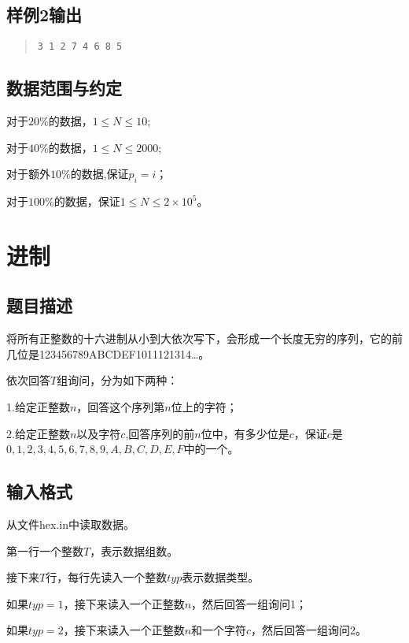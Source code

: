 ﻿\documentclass[12pt, a4paper]{article}
\begin{document}
\subsection{样例2输出}
\begin{quote}
\begin{verbatim}
3 1 2 7 4 6 8 5
\end{verbatim}
\end{quote}

\subsection{数据范围与约定}

对于$20\%$的数据，$1 \leq N \leq 10$;

对于$40\%$的数据，$1 \leq N \leq 2000$;

对于额外$10\%$的数据,保证$p_i=i$；

对于$100\%$的数据，保证$1 \leq N \leq 2\times 10^5$。

\newpage
\section{进制}

\subsection{题目描述}

将所有正整数的十六进制从小到大依次写下，会形成一个长度无穷的序列，它的前几位是123456789ABCDEF1011121314…。

依次回答$T$组询问，分为如下两种：

1.给定正整数$n$，回答这个序列第$n$位上的字符；

2.给定正整数$n$以及字符$c$,回答序列的前$n$位中，有多少位是$c$，保证$c$是$0,1,2,3,4,5,6,7,8,9,A,B,C,D,E,F$中的一个。

\subsection{输入格式}

从文件hex.in中读取数据。

第一行一个整数$T$，表示数据组数。

接下来$T$行，每行先读入一个整数$typ$表示数据类型。

如果$typ=1$，接下来读入一个正整数$n$，然后回答一组询问1；

如果$typ=2$，接下来读入一个正整数$n$和一个字符$c$，然后回答一组询问2。
\end{document}
